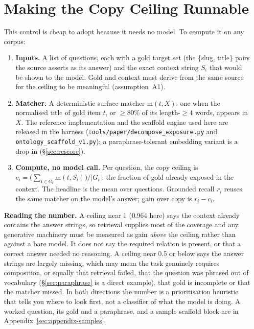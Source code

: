 \documentclass[10pt,twocolumn]{article}
\begin{document}
\section{Making the Copy Ceiling Runnable}\label{sec:runnable}
This control is cheap to adopt because it needs no model. To compute it on any corpus:
\begin{enumerate}[topsep=2pt,itemsep=1pt,leftmargin=1.6em]
\item \textbf{Inputs.} A list of questions, each with a gold target set (the \{slug, title\} pairs the source asserts as its answer) and the exact context string $S_i$ that would be shown to the model. Gold and context must derive from the same source for the ceiling to be meaningful (assumption~A1).
\item \textbf{Matcher.} A deterministic surface matcher $\mathrm{m}(t,X)$: one when the normalised title of gold item $t$, or $\geq80\%$ of its length-$\geq4$ words, appears in $X$. The reference implementation and the scaffold engine used here are released in the harness (\texttt{tools/paper/decompose\_exposure.py} and \texttt{ontology\_scaffold\_v1.py}); a paraphrase-tolerant embedding variant is a drop-in (\S\ref{sec:rescore}).
\item \textbf{Compute, no model call.} Per question, the copy ceiling is $c_i=\bigl(\sum_{t\in G_i}\mathrm{m}(t,S_i)\bigr)/|G_i|$: the fraction of gold already exposed in the context. The headline is the mean over questions. Grounded recall $r_i$ reuses the same matcher on the model's answer; gain over copy is $r_i-c_i$.
\end{enumerate}
\textbf{Reading the number.} A ceiling near 1 (0.964 here) says the context already contains the answer strings, so retrieval supplies most of the coverage and any generative machinery must be measured as gain \emph{above} the ceiling rather than against a bare model. It does not say the required relation is present, or that a correct answer needed no reasoning. A ceiling near 0.5 or below says the answer strings are largely missing, which may mean the task genuinely requires composition, or equally that retrieval failed, that the question was phrased out of vocabulary (\S\ref{sec:paraphrase} is a direct example), that gold is incomplete or that the matcher missed. In both directions the number is a prioritisation heuristic that tells you where to look first, not a classifier of what the model is doing. A worked question, its gold and a paraphrase, and a sample scaffold block are in Appendix~\ref{sec:appendix-samples}.
\end{document}
